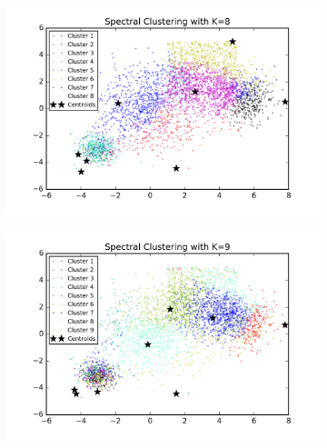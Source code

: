 \begin{figure}[htb]
\begin{subfigure}[b]{0.475\textwidth}
        \end{subfigure}
        \hfill
        \begin{subfigure}[b]{0.475\textwidth}  
            \centering 
            \includegraphics[width=\textwidth]{./figures/bigClustering_spectral_8.png}
        \end{subfigure}
        \begin{subfigure}[b]{0.475\textwidth}   
            \centering 
            \includegraphics[width=\textwidth]{./figures/bigClustering_spectral_9.png}
        \end{subfigure}
        \hfill
        \begin{subfigure}[b]{0.475\textwidth}   
            \centering 

\end{subfigure}
\end{figure}
